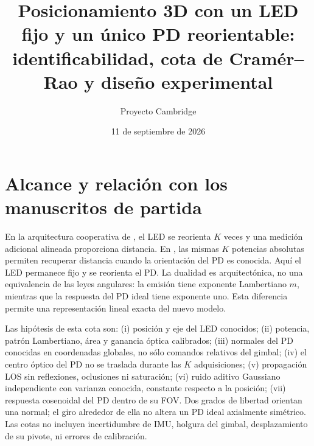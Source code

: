 \documentclass[11pt,a4paper]{article}
\title{Posicionamiento 3D con un LED fijo y un único PD reorientable:\\identificabilidad, cota de Cramér--Rao y diseño experimental}
\author{Proyecto Cambridge}
\date{11 de septiembre de 2026}
\begin{document}
\maketitle

\section{Alcance y relación con los manuscritos de partida}
En la arquitectura cooperativa de \cite{tcom}, el LED se reorienta $K$ veces y una medición adicional alineada proporciona distancia. En \cite{broadcast}, las mismas $K$ potencias absolutas permiten recuperar distancia cuando la orientación del PD es conocida. Aquí el LED permanece fijo y se reorienta el PD. La dualidad es arquitectónica, no una equivalencia de las leyes angulares: la emisión tiene exponente Lambertiano $m$, mientras que la respuesta del PD ideal tiene exponente uno. Esta diferencia permite una representación lineal exacta del nuevo modelo.

Las hipótesis de esta cota son: (i) posición y eje del LED conocidos; (ii) potencia, patrón Lambertiano, área y ganancia óptica calibrados; (iii) normales del PD conocidas en coordenadas globales, no sólo comandos relativos del gimbal; (iv) el centro óptico del PD no se traslada durante las $K$ adquisiciones; (v) propagación LOS sin reflexiones, oclusiones ni saturación; (vi) ruido aditivo Gaussiano independiente con varianza conocida, constante respecto a la posición; (vii) respuesta cosenoidal del PD dentro de su FOV. Dos grados de libertad orientan una normal; el giro alrededor de ella no altera un PD ideal axialmente simétrico. Las cotas no incluyen incertidumbre de IMU, holgura del gimbal, desplazamiento de su pivote, ni errores de calibración.
\end{document}
